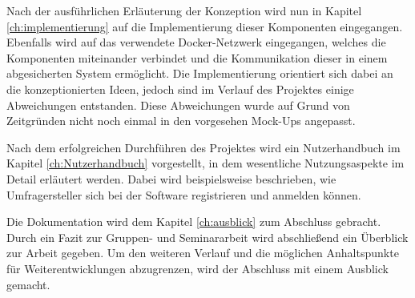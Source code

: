 Nach der ausführlichen Erläuterung der Konzeption wird nun in Kapitel \vref{ch:implementierung} auf die Implementierung dieser Komponenten eingegangen. 
Ebenfalls wird auf das verwendete Docker-Netzwerk eingegangen, welches die Komponenten miteinander verbindet und die Kommunikation dieser in einem abgesicherten System ermöglicht.
Die Implementierung orientiert sich dabei an die konzeptionierten Ideen, jedoch sind im Verlauf des Projektes einige Abweichungen entstanden.
Diese Abweichungen wurde auf Grund von Zeitgründen nicht noch einmal in den vorgesehen Mock-Ups angepasst.

Nach dem erfolgreichen Durchführen des Projektes wird ein Nutzerhandbuch im Kapitel \vref{ch:Nutzerhandbuch} vorgestellt, in dem wesentliche Nutzungsaspekte im Detail erläutert werden.
Dabei wird beispielsweise beschrieben, wie Umfragersteller sich bei der Software registrieren und anmelden können.

Die Dokumentation wird dem Kapitel \vref{ch:ausblick} zum Abschluss gebracht. 
Durch ein Fazit zur Gruppen- und Seminararbeit wird abschließend ein Überblick zur Arbeit gegeben. 
Um den weiteren Verlauf und die möglichen Anhaltspunkte für Weiterentwicklungen abzugrenzen, wird der Abschluss mit einem Ausblick gemacht.